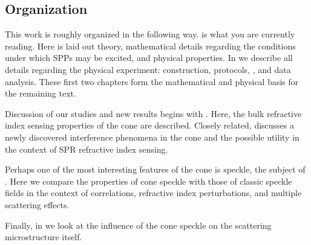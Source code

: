 \subsection{Organization}
This work is roughly organized in the following way.
 is what you are currently reading.  Here is laid out
theory, mathematical details regarding the conditions under which SPPs may
be excited, and physical properties.  In  we
describe all details regarding the physical experiment: construction,
protocols, , and data analysis.  These first two chapters form the
mathematical and physical basis for the remaining text.

Discussion of our studies and new results begins with .
Here, the bulk refractive index sensing properties of the cone are
described.  Closely related,  discusses a newly
discovered interference phenomena in the cone and the possible utility in
the context of SPR refractive index sensing.

Perhaps one of the most interesting features of the cone is speckle, the
subject of .  Here we compare the properties of cone
speckle with those of classic speckle fields in the context of
correlations, refractive index perturbations, and multiple scattering
effects.

Finally, in  we look at the influence of the
cone speckle on the scattering microstructure itself.
